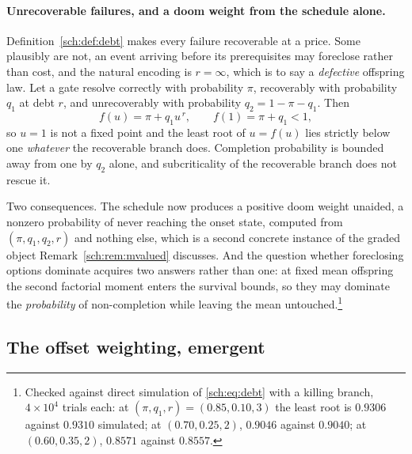 \paragraph{Unrecoverable failures, and a doom weight from the
schedule alone.}\label{sch:rem:defective}
Definition~\ref{sch:def:debt} makes every failure recoverable at a
price. Some plausibly are not, an event arriving before its
prerequisites may foreclose rather than cost, and the natural
encoding is $r=\infty$, which is to say a \emph{defective} offspring
law. Let a gate resolve correctly with probability $\pi$, recoverably
with probability $q_1$ at debt $r$, and unrecoverably with probability
$q_2=1-\pi-q_1$. Then
\begin{equation}\label{sch:eq:defective}
f(u)=\pi+q_1u^{\,r},\qquad f(1)=\pi+q_1<1,
\end{equation}
so $u=1$ is not a fixed point and the least root of $u=f(u)$ lies
strictly below one \emph{whatever} the recoverable branch does.
Completion probability is bounded away from one by $q_2$ alone, and
subcriticality of the recoverable branch does not rescue it.

Two consequences. The schedule now produces a positive doom weight
unaided, a nonzero probability of never reaching the onset state,
computed from $(\pi,q_1,q_2,r)$ and nothing else, which is a second
concrete instance of the graded object
Remark~\ref{sch:rem:mvalued} discusses. And the question whether
foreclosing options dominate acquires two answers rather than one: at
fixed mean offspring the second factorial moment enters the survival
bounds, so they may dominate the \emph{probability} of non-completion
while leaving the mean untouched.\footnote{Checked
against direct simulation of \eqref{sch:eq:debt} with a killing branch,
$4\times10^{4}$ trials each: at $(\pi,q_1,r)=(0.85,0.10,3)$ the least
root is $0.9306$ against $0.9310$ simulated; at $(0.70,0.25,2)$,
$0.9046$ against $0.9040$; at $(0.60,0.35,2)$, $0.8571$ against
$0.8557$.}

\subsection{The offset weighting, emergent}\label{sch:subsub:emergent}


